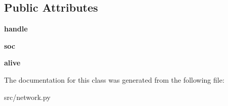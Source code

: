 \subsection*{\-Public \-Attributes}
\begin{DoxyCompactItemize}
\item 
\hypertarget{classsrc_1_1network_1_1_network_client_a156d68736ff3ba58e762c75ae4dee23c}{{\bfseries handle}}\label{classsrc_1_1network_1_1_network_client_a156d68736ff3ba58e762c75ae4dee23c}

\item 
\hypertarget{classsrc_1_1network_1_1_network_client_a9de2ae293039b09bb81d75f411c14c52}{{\bfseries soc}}\label{classsrc_1_1network_1_1_network_client_a9de2ae293039b09bb81d75f411c14c52}

\item 
\hypertarget{classsrc_1_1network_1_1_network_client_a2810710f068542108ae53baca2185484}{{\bfseries alive}}\label{classsrc_1_1network_1_1_network_client_a2810710f068542108ae53baca2185484}

\end{DoxyCompactItemize}


\-The documentation for this class was generated from the following file\-:\begin{DoxyCompactItemize}
\item 
src/network.\-py\end{DoxyCompactItemize}
